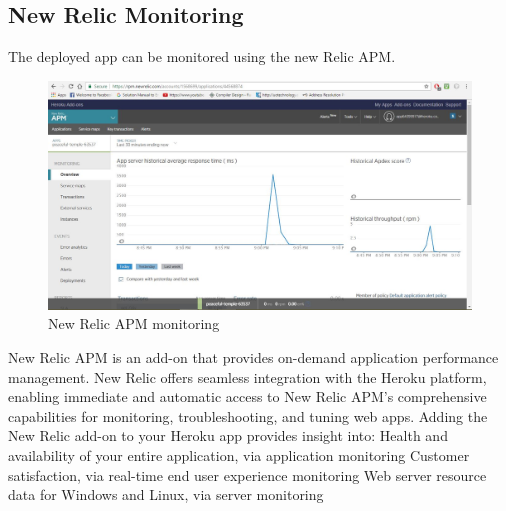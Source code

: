 \documentclass[12pt,a4paper,oneside]{report}
\begin{document}
{\subsection{New Relic Monitoring}
\par The deployed app can be monitored using the new Relic APM.
\begin{figure}[h]
\begin{center}
\includegraphics[scale=.47]{newrelic.png}
\caption{New Relic APM monitoring}
\label{New Relic APM monitoring}
\end{center}
\end{figure}
\par New Relic APM is an add-on that provides on-demand application performance management. New Relic offers seamless integration with the Heroku platform, enabling immediate and automatic access to New Relic APM’s comprehensive capabilities for monitoring, troubleshooting, and tuning web apps.
Adding the New Relic add-on to your Heroku app provides insight into:
Health and availability of your entire application, via application monitoring
Customer satisfaction, via real-time end user experience monitoring
Web server resource data for Windows and Linux, via server monitoring

\newpage

\newpage
}
\end{document}
